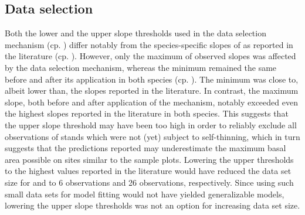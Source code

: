 \subsection{Data selection}

Both the lower and the upper slope thresholds used in the data selection mechanism (cp. ) differ notably from the species-specific slopes of  as reported in the literature (cp. ).  However, only the maximum of observed slopes was affected by the data selection mechanism, whereas the minimum remained the same before and after its application in both species (cp. ).  The minimum was close to, albeit lower than, the slopes reported in the literature.  In contrast, the maximum slope, both before and after application of the mechanism, notably exceeded even the highest slopes reported in the literature in both species.   This suggests that the upper slope threshold may have been too high in order to reliably exclude all observations of stands which were not (yet) subject to self-thinning, which in turn suggests that the predictions reported may underestimate the maximum basal area possible on sites similar to the sample plots.  Lowering the upper thresholds to the highest values reported in the literature would have reduced the data set size for \Beech{} and \Spruce{} to \num{6} observations and \num{26} observations, respectively.  Since using such small data sets for model fitting would not have yielded generalizable models, lowering the upper slope thresholds was not an option for increasing data set size.


